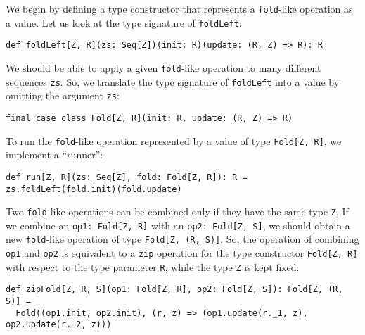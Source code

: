 We begin by defining a type constructor that represents a \lstinline!fold!-like
operation as a value. Let us look at the type signature of \lstinline!foldLeft!:
\begin{lstlisting}
def foldLeft[Z, R](zs: Seq[Z])(init: R)(update: (R, Z) => R): R
\end{lstlisting}
We should be able to apply a given \lstinline!fold!-like operation
to many different sequences \lstinline!zs!. So, we translate the
type signature of \lstinline!foldLeft! into a value by omitting the
argument \lstinline!zs!:
\begin{lstlisting}
final case class Fold[Z, R](init: R, update: (R, Z) => R)
\end{lstlisting}
To run the \lstinline!fold!-like operation represented by a value
of type \lstinline!Fold[Z, R]!, we implement a \textsf{``}runner\textsf{''}:
\begin{lstlisting}
def run[Z, R](zs: Seq[Z], fold: Fold[Z, R]): R = zs.foldLeft(fold.init)(fold.update)
\end{lstlisting}

Two \lstinline!fold!-like operations can be combined only if they
have the same type \lstinline!Z!. If we combine an \lstinline!op1: Fold[Z, R]!
with an \lstinline!op2: Fold[Z, S]!, we should obtain a new \lstinline!fold!-like
operation of type \lstinline!Fold[Z, (R, S)]!. So, the operation
of combining \lstinline!op1! and \lstinline!op2! is equivalent to
a \lstinline!zip! operation for the type constructor \lstinline!Fold[Z, R]!
with respect to the type parameter \lstinline!R!, while the type
\lstinline!Z! is kept fixed:
\begin{lstlisting}
def zipFold[Z, R, S](op1: Fold[Z, R], op2: Fold[Z, S]): Fold[Z, (R, S)] =
  Fold((op1.init, op2.init), (r, z) => (op1.update(r._1, z), op2.update(r._2, z)))
\end{lstlisting}

